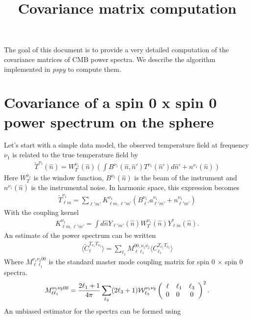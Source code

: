 \documentclass[a4paper, 11pt]{article}
\def\ba{\begin{eqnarray}}
\def\ea{\end{eqnarray}}
\begin{document}
\title{\textbf{Covariance matrix computation}}
\maketitle

The goal of this document is to provide a very detailed computation of the covariance matrices of CMB power spectra. We describe the algorithm implemented in {\it pspy} to compute  them. 

\section{Covariance of a spin 0 x spin 0 power spectrum on the sphere}

Let's start with a simple data model, the observed temperature field at frequency $\nu_{1}$ is related to the true temperature field by
\ba
\tilde{T}^{\nu_{1}}(\hat{n})= W_{T}^{ \nu_{1}}(\hat{n}) \left(\int B^{\nu_{1}}(\hat{n},\hat{n}')  T^{\nu_{1}}(\hat{n}')d\hat{n}' + n^{\nu_{1}}(\hat{n}) \right)
\ea
Here $W_{T}^{ \nu_{1}}$ is the window function,  $B^{\nu_{1}}(\hat{n})$ is the beam of the instrument and $n^{\nu_{1}}(\hat{n}) $ is the instrumental noise. In harmonic space, this expression becomes
\ba
\tilde{T}^{\nu_{1}}_{ \ell m}= \sum_{\ell' m'} K^{\nu_{1}}_{\ell m, \ell' m'}( B^{\nu_{1}}_{\ell'} a^{\nu_{1}}_{\ell'm'} + n^{\nu_{1}}_{ \ell' m'})
\ea
With the coupling kernel
\ba
 K^{\nu_{1}}_{\ell m, \ell' m'}= \int d \hat{n} Y_{\ell' m'} (\hat{n}) W_{T}^{ \nu_{1}}(\hat{n})Y^{*}_{\ell m} (\hat{n}).
\ea
An estimate of the power spectrum can be written
\ba
\langle \tilde{C}^{T_{\nu_{1}}T_{\nu_{2}}}_{\ell} \rangle = \sum_{\ell_1}M^{00, \nu_{1}\nu_{2}}_{ \ell \ell_1} \langle C^{T_{\nu_{1}}T_{\nu_{2}}}_{\ell_1} \rangle
\ea
Where $M^{\nu_{1}\nu_{2}00}_{ \ell \ell_1}$ is the standard master mode coupling matrix for spin 0 $\times$ spin 0 spectra.
\ba
M^{\nu_{1}\nu_{2}00}_{ \ell \ell_1}=   \frac{2\ell_1 +1}{4\pi}  \sum_{ \ell_3} (2\ell_3+1) {\cal W}^{\nu_{1}\nu_{2}}_{\ell_3} 
\left(\begin{array}{clcr}
\ell & \ell_1 & \ell_3\\
0 & 0 & 0 \end{array}\right)^{2} .
\ea 
An unbiased estimator for the spectra can be formed using
\end{document}
